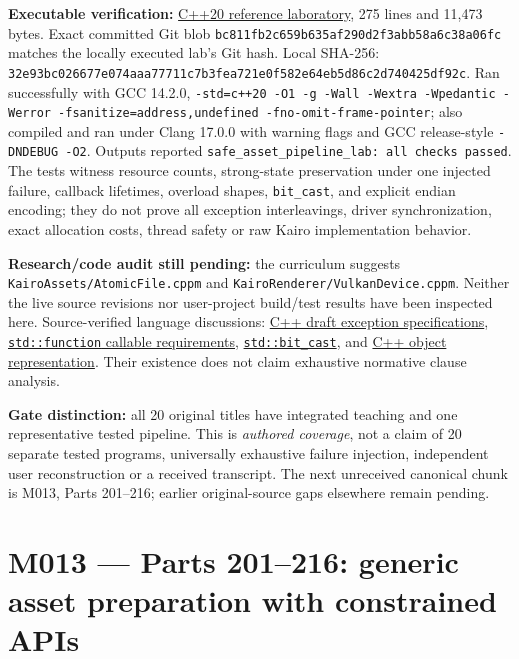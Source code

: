 \textbf{Executable verification:} \href{tools/labs/safe_asset_pipeline_lab.cpp}{C++20 reference laboratory}, 275 lines and 11,473 bytes. Exact committed Git blob \texttt{bc811fb2c659b635af290d2f3abb58a6c38a06fc} matches the locally executed lab's Git hash. Local SHA-256: \texttt{32e93bc026677e074aaa77711c7b3fea721e0f582e64eb5d86c2d740425df92c}. Ran successfully with GCC 14.2.0, \texttt{-std=c++20\ -O1\ -g\ -Wall\ -Wextra\ -Wpedantic\ -Werror\ -fsanitize=address,undefined\ -fno-omit-frame-pointer}; also compiled and ran under Clang 17.0.0 with warning flags and GCC release-style \texttt{-DNDEBUG\ -O2}. Outputs reported \texttt{safe\_asset\_pipeline\_lab:\ all\ checks\ passed}. The tests witness resource counts, strong-state preservation under one injected failure, callback lifetimes, overload shapes, \texttt{bit\_cast}, and explicit endian encoding; they do not prove all exception interleavings, driver synchronization, exact allocation costs, thread safety or raw Kairo implementation behavior.

\textbf{Research/code audit still pending:} the curriculum suggests \texttt{KairoAssets/AtomicFile.cppm} and \texttt{KairoRenderer/VulkanDevice.cppm}. Neither the live source revisions nor user-project build/test results have been inspected here. Source-verified language discussions: \href{https://eel.is/c++draft/except.spec}{C++ draft exception specifications}, \href{https://en.cppreference.com/w/cpp/utility/functional/function}{\texttt{std::function} callable requirements}, \href{https://en.cppreference.com/w/cpp/numeric/bit_cast}{\texttt{std::bit\_cast}}, and \href{https://en.cppreference.com/w/cpp/language/object}{C++ object representation}. Their existence does not claim exhaustive normative clause analysis.

\textbf{Gate distinction:} all 20 original titles have integrated teaching and one representative tested pipeline. This is \emph{authored coverage}, not a claim of 20 separate tested programs, universally exhaustive failure injection, independent user reconstruction or a received transcript. The next unreceived canonical chunk is M013, Parts 201--216; earlier original-source gaps elsewhere remain pending.

\section{M013 --- Parts 201--216: generic asset preparation with constrained APIs}\label{appendix-fd090d982a15-m013-parts-201216-generic-asset-preparation-with-constrained-apis}

